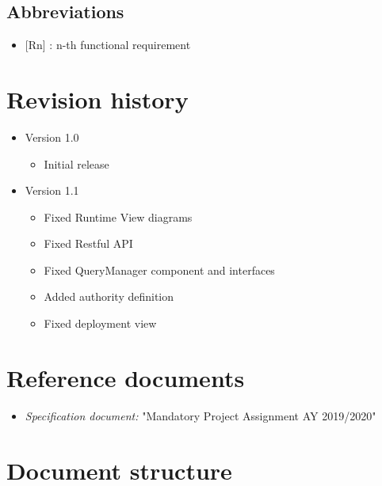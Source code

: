 			\subsection{Abbreviations}
				\begin{itemize}
					\item {[Rn]} : n-th functional requirement
				\end{itemize}
		\section{Revision history}
			\begin{itemize}
				\item Version 1.0
					\begin{itemize}
						\item Initial release
					\end{itemize}
				\item Version 1.1
					\begin{itemize}
						\item Fixed Runtime View diagrams
						\item Fixed Restful API
						\item Fixed QueryManager component and interfaces
						\item Added authority definition
						\item Fixed deployment view
					\end{itemize}
			\end{itemize}
		\section{Reference documents}
			\begin{itemize}
				\item \textit{Specification document:} "Mandatory Project Assignment AY 2019/2020"
			\end{itemize}
		\section{Document structure}
